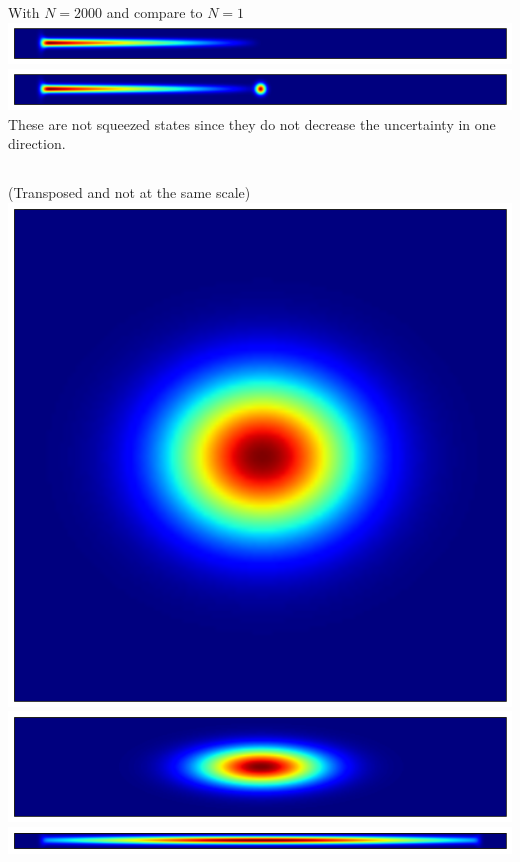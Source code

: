 \documentclass[10pt,fleqn]{article}
\begin{document}
With $N=2000$ and compare to $N=1$\\
\includegraphics[width=15cm]{3-3-2000.png}\\
\includegraphics[width=15cm]{3-3-2000_0.png}\\
These are not squeezed states since they do not decrease the uncertainty in one direction.

\subsection{}
(Transposed and not at the same scale)\\
\includegraphics[width=15cm]{3-4-02.png}\\
\includegraphics[width=15cm]{3-4-12.png}\\
\includegraphics[width=15cm]{3-4-4.png}
\end{document}
